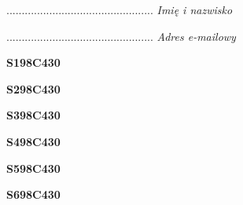 \begin{turn}{90}\begin{minipage}{\linewidth} \vspace{20mm} ................................................  \textit{Imię i nazwisko}\end{minipage}\end{turn}

\begin{turn}{90}\begin{minipage}{\linewidth} \vspace{20mm} ................................................  \textit{Adres e-mailowy}\end{minipage}\end{turn}

\begin{turn}{90}\huge \begin{minipage}{\linewidth} \vspace{10mm}\textbf{S198C430}\end{minipage}\end{turn}

\begin{turn}{90}\huge \begin{minipage}{\linewidth} \vspace{10mm}\textbf{S298C430}\end{minipage}\end{turn}

\begin{turn}{90}\huge \begin{minipage}{\linewidth} \vspace{10mm}\textbf{S398C430}\end{minipage}\end{turn}

\begin{turn}{90}\huge \begin{minipage}{\linewidth} \vspace{10mm}\textbf{S498C430}\end{minipage}\end{turn}

\begin{turn}{90}\huge \begin{minipage}{\linewidth} \vspace{10mm}\textbf{S598C430}\end{minipage}\end{turn}

\begin{turn}{90}\huge \begin{minipage}{\linewidth} \vspace{10mm}\textbf{S698C430}\end{minipage}\end{turn}

